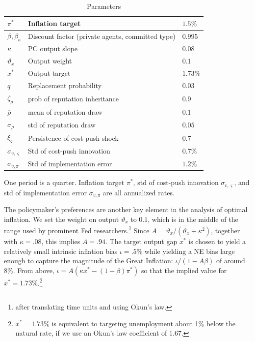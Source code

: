 \documentclass[12pt,letter,leqno]{article}
\theoremstyle{asn}
\theoremstyle{lem}
\theoremstyle{slem}
\theoremstyle{prop}
\theoremstyle{appprop}
\theoremstyle{rem}
\theoremstyle{defn}
\begin{document}
\begin{table}[ht]
\centering
\caption{Parameters}
\begin{tabular}{|l|l|l|}

\hline
$\pi^{\ast }$ & Inflation target & $1.5\%$ \\ \hline
$\beta ,\beta_{a}$ & Discount factor (private agents, committed type) & $0.995$ \\ \hline
$\kappa $ & PC output slope & $0.08$ \\ \hline
$\vartheta _{x}$ & Output weight & $0.1$ \\ \hline
$x^{\ast }$ & Output target & $1.73\%$ \\ \hline
$q$ & Replacement probability & $0.03$ \\ \hline
$\zeta_{\rho}$ & prob of reputation inheritance & $0.9$ \\ \hline
$\overline{\rho}$ & mean of reputation draw& $0.1$ \\ \hline
$\sigma _{\rho}$ & std of reputation draw & $0.05$ \\ \hline
$\xi_\varsigma $ & Persistence of cost-push shock & $0.7$  \\ \hline
$\sigma _{v,\varsigma}$ & Std of cost-push innovation & $0.7\%$ \\ \hline
$\sigma _{v,\pi}$ & Std of implementation error & $1.2\%$ \\ \hline
\end{tabular}\label{tab:calib}

\begin{flushleft}
\footnotesize{One period is a quarter. Inflation target $\pi^*$, std of cost-push innovation $\sigma _{v,\varsigma}$, and std of implementation error $\sigma _{v,\pi}$ are all annualized rates.}
\end{flushleft}
\end{table}
The policymaker's preferences are another key element in the analysis of optimal inflation. We set the weight on output $\vartheta_x$ to $0.1$, which is in the middle of the range used by prominent Fed researchers.\footnote{\cite{brayton_optimal-control_2014} after translating time units and using Okun's law.} Since $A=\vartheta_{x}/(\vartheta_{x}+\kappa^2)$,  together with $\kappa=.08$, this  implies $A=.94$. 
The target output gap $x^*$ is chosen to yield a relatively small intrinsic inflation bias $\iota=.5\%$ while yielding a NE bias large enough to capture the magnitude of the Great Inflation: $\iota/(1-A \beta)$ of around $8\%$. From above,  $\iota=A(\kappa x^*-(1-\beta)\pi^{\ast})$ so that the implied value for $x^*=1.73\%$.\footnote{$x^*=1.73\%$ is equivalent to targeting unemployment about 1\% below the natural rate, if we use an Okun's law coefficient of 1.67.}
\end{document}
